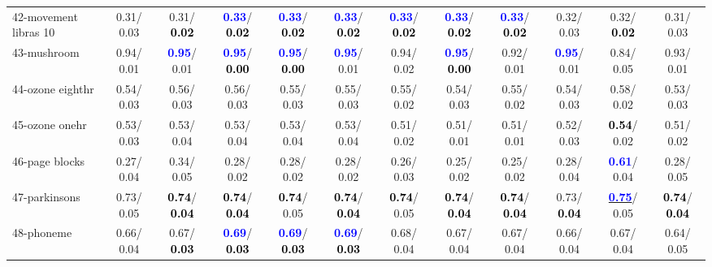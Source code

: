 \begin{table}[h]
\begin{center}
{\begin{tabular}{lc|c|c|c|c|c|c|c|c|c|c}
42-movement libras 10 &   0.31/  0.03 &   0.31/\textcolor{black}{\textbf{  0.02}} & \textcolor{blue}{\textbf{  0.33}}/\textcolor{black}{\textbf{  0.02}} & \textcolor{blue}{\textbf{  0.33}}/\textcolor{black}{\textbf{  0.02}} & \textcolor{blue}{\textbf{  0.33}}/\textcolor{black}{\textbf{  0.02}} & \textcolor{blue}{\textbf{  0.33}}/\textcolor{black}{\textbf{  0.02}} & \textcolor{blue}{\textbf{  0.33}}/\textcolor{black}{\textbf{  0.02}} & \textcolor{blue}{\textbf{  0.33}}/\textcolor{black}{\textbf{  0.02}} &   0.32/  0.03 &   0.32/\textcolor{black}{\textbf{  0.02}} &   0.31/  0.03 \\
43-mushroom &   0.94/  0.01 & \textcolor{blue}{\textbf{  0.95}}/  0.01 & \textcolor{blue}{\textbf{  0.95}}/\textcolor{black}{\textbf{  0.00}} & \textcolor{blue}{\textbf{  0.95}}/\textcolor{black}{\textbf{  0.00}} & \textcolor{blue}{\textbf{  0.95}}/  0.01 &   0.94/  0.02 & \textcolor{blue}{\textbf{  0.95}}/\textcolor{black}{\textbf{  0.00}} &   0.92/  0.01 & \textcolor{blue}{\textbf{  0.95}}/  0.01 &   0.84/  0.05 &   0.93/  0.01 \\
44-ozone eighthr &   0.54/  0.03 &   0.56/  0.03 &   0.56/  0.03 &   0.55/  0.03 &   0.55/  0.03 &   0.55/  0.02 &   0.54/  0.03 &   0.55/  0.02 &   0.54/  0.03 &   0.58/  0.02 &   0.53/  0.03 \\
45-ozone onehr &   0.53/  0.03 &   0.53/  0.04 &   0.53/  0.04 &   0.53/  0.04 &   0.53/  0.04 &   0.51/  0.02 &   0.51/  0.01 &   0.51/  0.01 &   0.52/  0.03 & \textcolor{black}{\textbf{  0.54}}/  0.02 &   0.51/  0.02 \\
46-page blocks &   0.27/  0.04 &   0.34/  0.05 &   0.28/  0.02 &   0.28/  0.02 &   0.28/  0.02 &   0.26/  0.03 &   0.25/  0.02 &   0.25/  0.02 &   0.28/  0.04 & \textcolor{blue}{\textbf{  0.61}}/  0.04 &   0.28/  0.05 \\ \hline
47-parkinsons &   0.73/  0.05 & \textcolor{black}{\textbf{  0.74}}/\textcolor{black}{\textbf{  0.04}} & \textcolor{black}{\textbf{  0.74}}/\textcolor{black}{\textbf{  0.04}} & \textcolor{black}{\textbf{  0.74}}/  0.05 & \textcolor{black}{\textbf{  0.74}}/\textcolor{black}{\textbf{  0.04}} & \textcolor{black}{\textbf{  0.74}}/  0.05 & \textcolor{black}{\textbf{  0.74}}/\textcolor{black}{\textbf{  0.04}} & \textcolor{black}{\textbf{  0.74}}/\textcolor{black}{\textbf{  0.04}} &   0.73/\textcolor{black}{\textbf{  0.04}} & \underline{\textcolor{blue}{\textbf{  0.75}}}/  0.05 & \textcolor{black}{\textbf{  0.74}}/\textcolor{black}{\textbf{  0.04}} \\
48-phoneme &   0.66/  0.04 &   0.67/\textcolor{black}{\textbf{  0.03}} & \textcolor{blue}{\textbf{  0.69}}/\textcolor{black}{\textbf{  0.03}} & \textcolor{blue}{\textbf{  0.69}}/\textcolor{black}{\textbf{  0.03}} & \textcolor{blue}{\textbf{  0.69}}/\textcolor{black}{\textbf{  0.03}} &   0.68/  0.04 &   0.67/  0.04 &   0.67/  0.04 &   0.66/  0.04 &   0.67/  0.04 &   0.64/  0.05 \\

\end{tabular}}
\end{center}
\end{table}
